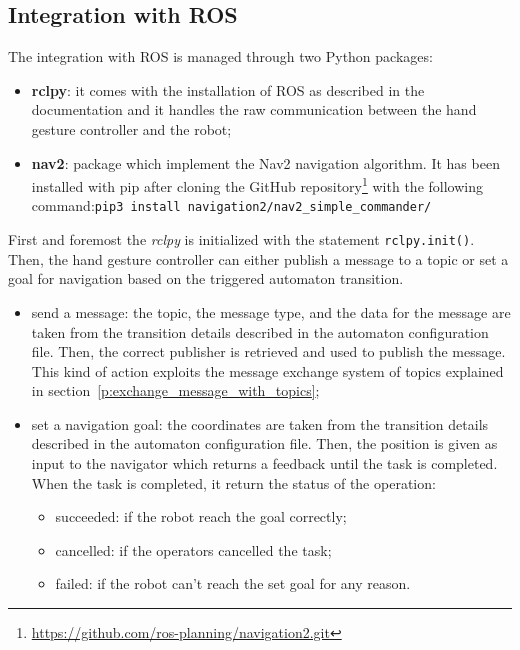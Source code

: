 \documentclass[../thesis.tex]{subfiles}
\begin{document}
\subsection{Integration with ROS}
The integration with \acrshort{ROS} is managed through two Python packages:
\begin{itemize}
    \item \textbf{rclpy}: it comes with the installation of \acrshort{ROS} as described in the documentation and it handles the raw communication between the hand gesture controller and the robot;
    \item \textbf{nav2}: package which implement the Nav2 navigation algorithm. It has been installed with pip after cloning the GitHub repository\footnote{\href{https://github.com/ros-planning/navigation2.git}{https://github.com/ros-planning/navigation2.git}} with the following command:\newline\texttt{pip3 install navigation2/nav2\_simple\_commander/}
\end{itemize}
First and foremost the \textit{rclpy} is initialized with the statement \texttt{rclpy.init()}. Then, the hand gesture controller can either publish a message to a topic or set a goal for navigation based on the triggered automaton transition.
\begin{itemize}
    \item send a message: the topic, the message type, and the data for the message are taken from the transition details described in the automaton configuration file. Then, the correct publisher is retrieved and used to publish the message. This kind of action exploits the message exchange system of topics explained in section~\ref{p:exchange_message_with_topics};
    \item set a navigation goal: the coordinates are taken from the transition details described in the automaton configuration file. Then, the position is given as input to the navigator which returns a feedback until the task is completed. When the task is completed, it return the status of the operation:
    \begin{itemize}
        \item succeeded: if the robot reach the goal correctly;
        \item cancelled: if the operators cancelled the task;
        \item failed: if the robot can't reach the set goal for any reason.
    \end{itemize}
\end{itemize}
\end{document}
